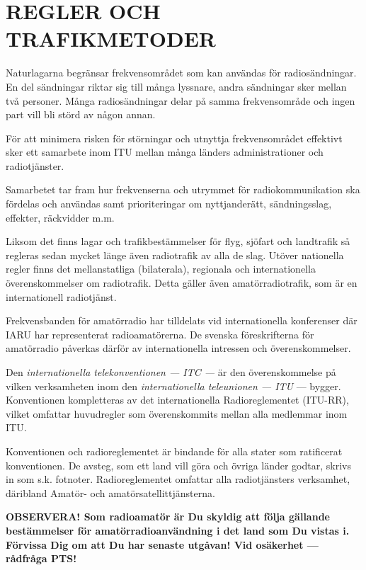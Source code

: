 \part{REGLER OCH TRAFIKMETODER}

Naturlagarna begränsar frekvensområdet som kan användas för radiosändningar.
En del sändningar riktar sig till många lyssnare, andra sändningar sker
mellan två personer. Många radiosändningar delar på samma frekvensområde och
ingen part vill bli störd av någon annan.

För att minimera risken för störningar och utnyttja frekvensområdet effektivt
sker ett samarbete inom ITU mellan många länders administrationer och
radiotjänster.

Samarbetet tar fram hur frekvenserna och utrymmet för radiokommunikation ska
fördelas och användas samt prioriteringar om nyttjanderätt, sändningsslag,
effekter, räckvidder m.m.

Liksom det finns lagar och trafikbestämmelser för flyg, sjöfart och landtrafik
så regleras sedan mycket länge även radiotrafik av alla de slag. Utöver
nationella regler finns det mellanstatliga (bilaterala), regionala och
internationella överenskommelser om radiotrafik. Detta gäller även
amatörradiotrafik, som är en internationell radiotjänst.

Frekvensbanden för amatörradio har tilldelats vid internationella konferenser
där IARU har representerat radioamatörerna. De svenska föreskrifterna för
amatörradio påverkas därför av internationella intressen och överenskommelser.

Den \emph{internationella telekonventionen --- ITC ---} är den
överenskommelse på vilken verksamheten inom den \emph{internationella
teleunionen --- ITU} --- bygger. Konventionen kompletteras av det internationella
Radioreglementet (ITU-RR), vilket omfattar huvudregler som överenskommits mellan
alla medlemmar inom ITU.

Konventionen och radioreglementet är bindande för alla stater som ratificerat
konventionen. De avsteg, som ett land vill göra och övriga länder godtar,
skrivs in som s.k. fotnoter. Radioreglementet omfattar alla radiotjänsters
verksamhet, däribland Amatör- och amatörsatellittjänsterna.

\textbf{OBSERVERA!  Som radioamatör är Du skyldig att följa gällande
  bestämmelser för amatörradioanvändning i det land som Du vistas i.
  Förvissa Dig om att Du har senaste utgåvan!  Vid osäkerhet ---
  rådfråga PTS!}
